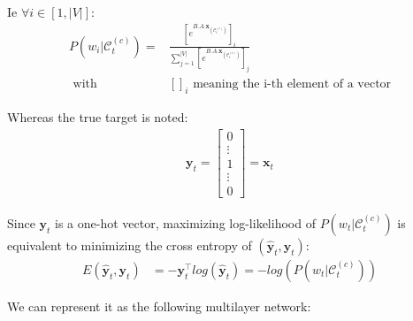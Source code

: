 Ie $\forall i \in [1, |V|]$:
\begin{align}
 P(w_{i} | \mathcal{C}_t^{(c)})= 
 	&\frac{  [e^{B.A.\mathbf{x}_{(\mathcal{C}_t^{(c)})}}]_i}
 	{\sum_{j=1}^{|V|} [e^{B.A.\mathbf{x}_{(\mathcal{C}_t^{(c)})}}]_j} \\
 	\text{      with}& []_i \text{ meaning the i-th element of a vector}
\end{align}


Whereas the true target is noted:
\begin{align}
 \mathbf{y}_t = 
	\begin{bmatrix} 
		0 \\
		\vdots \\
		1 \\
		\vdots \\
		0
	\end{bmatrix} 
	= \mathbf{x}_t
\end{align}


Since $\mathbf{y}_t$ is a one-hot vector, maximizing log-likelihood of $P(w_t | \mathcal{C}_t^{(c)})$ is equivalent to minimizing the cross entropy of $(\mathbf{\hat y}_t, \mathbf{y}_t)$:
\begin{align}
E(\mathbf{\hat y}_t, \mathbf{y}_t) &= - \mathbf{y}_t^{\top} log(\mathbf{\hat y}_t) = - log(P(w_t | \mathcal{C}_t^{(c)}))
\end{align}

We can represent it as the following multilayer network:

